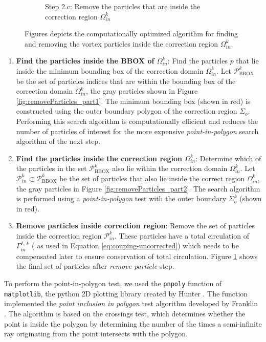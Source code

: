 \begin{figure}[p]
\begin{subfigure}[t]{0.55\textwidth}
		\caption{Step 2.c: Remove the particles that are inside the correction region $\Omega_{in}^k$}
		\label{fig:removeParticles_part3}
	 \end{subfigure}%

     \caption{Figures depicts the computationally optimized algorithm for finding and removing the vortex particles inside the correction region $\Omega_{in}^k$.}
     \label{fig:removeParticles}
	\end{figure}	

	
	\begin{enumerate}[label=2.\alph*)]
	\item \textbf{Find the particles inside the BBOX of $\Omega_{in}^k$}: Find the particles $p$ that lie inside the minimum bounding box of the correction domain $\Omega_{in}^k$. Let $\mathcal{P}_{\mathrm{BBOX}}^k$ be the set of particles indices that are within the bounding box of the correction domain $\Omega_{in}^k$, the gray particles shown in Figure \ref{fig:removeParticles_part1}. The minimum bounding box (shown in red) is constructed using the outer boundary polygon of the correction region $\Sigma_{o}$. Performing this search algorithm is computationally efficient and reduces the number of particles of interest for the more expensive \textit{point-in-polygon} search algorithm of the next step.
	\item \textbf{Find the particles inside the correction region $\Omega_{in}^k$}: Determine which of the particles in the set $\mathcal{P}_{\mathrm{BBOX}}^k$ also lie within the correction domain $\Omega_{in}^k$. Let $\mathcal{P}_{in}^k\subset\mathcal{P}_{\mathrm{BBOX}}^k$ be the set of particles that also lie inside the correct region $\Omega_{in}^k$, the gray particles in Figure \ref{fig:removeParticles_part2}. The search algorithm is performed using a \textit{point-in-polygon} test with the outer boundary $\Sigma_{o}^k$ (shown in red).
	\item \textbf{Remove particles inside correction region}: Remove the set of particles inside the correction region $\mathcal{P}_{in}^k$. These particles have a total circulation of $\Gamma_{in}^{L,k}$ ( as used in Equation \ref{eq:couping-uncorrected}) which needs to be compensated later to ensure conservation of total circulation. Figure \ref{fig:removeParticles_part3} shows the final set of particles after \textit{remove particle} step.
	\end{enumerate}	
		
	To perform the point-in-polygon test, we used the \texttt{pnpoly} function of \texttt{matplotlib}, the python 2D plotting library created by Hunter \cite{Hunter:2007}. The function implemented the \textit{point inclusion in polygon} test algorithm developed by Franklin \cite{franklin2006pnpoly}. The algorithm is based on the crossings test, which determines whether the point is inside the polygon by determining the number of the times a semi-infinite ray originating from the point intersects with the polygon.
	
